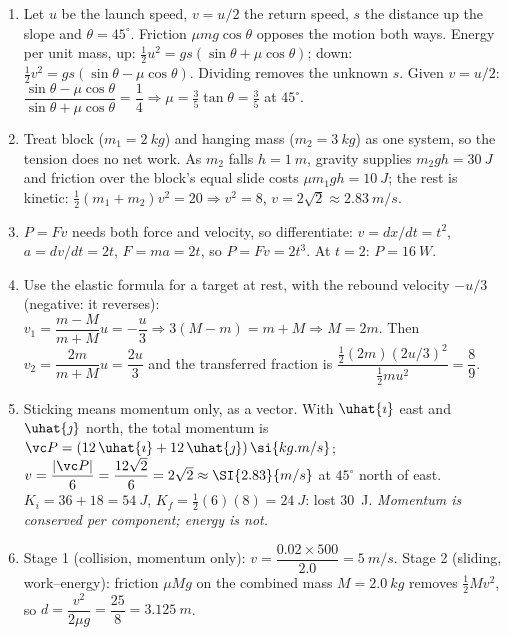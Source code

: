 \begin{enumerate}[label=\textbf{\arabic*.},itemsep=5pt]
\item Let $u$ be the launch speed, $v=u/2$ the return speed, $s$ the distance up the slope and
$\theta=45^\circ$. Friction $\mu mg\cos\theta$ opposes the motion both ways. Energy per unit mass, up:
$\tfrac12u^2=gs(\sin\theta+\mu\cos\theta)$; down: $\tfrac12v^2=gs(\sin\theta-\mu\cos\theta)$. Dividing
removes the unknown $s$.
Given $v=u/2$: $\dfrac{\sin\theta-\mu\cos\theta}{\sin\theta+\mu\cos\theta}=\dfrac14\Rightarrow
\mu=\tfrac35\tan\theta=\tfrac35$ at $45^\circ$. 

\item Treat block ($m_1=\SI{2}{kg}$) and hanging mass ($m_2=\SI{3}{kg}$) as one system, so the tension
does no net work. As $m_2$ falls $h=\SI{1}{m}$, gravity supplies $m_2gh=\SI{30}{J}$ and friction over the
block's equal slide costs $\mu m_1gh=\SI{10}{J}$; the rest is kinetic:
$\tfrac12(m_1+m_2)v^2=20\Rightarrow v^2=8$, $v=2\sqrt2\approx\SI{2.83}{m/s}$.

\item $P=Fv$ needs both force and velocity, so differentiate: $v=dx/dt=t^2$, $a=dv/dt=2t$, $F=ma=2t$,
so $P=Fv=2t^3$. At $t=2$: $P=\SI{16}{W}$. 

\item Use the elastic formula for a target at rest, with the rebound velocity $-u/3$ (negative: it
reverses): $v_1=\dfrac{m-M}{m+M}u=-\dfrac{u}{3}\Rightarrow 3(M-m)=m+M\Rightarrow M=2m$. Then
$v_2=\dfrac{2m}{m+M}u=\dfrac{2u}{3}$ and the transferred fraction is
$\dfrac{\tfrac12(2m)(2u/3)^2}{\tfrac12mu^2}=\dfrac89$. 

\item Sticking means momentum only, as a vector. With $\uhat{\imath}$ east and $\uhat{\jmath}$ north,
the total momentum is $\vc P=(12\,\uhat{\imath}+12\,\uhat{\jmath})\,\si{kg.m/s}$; $v=\dfrac{|\vc P|}{6}=
\dfrac{12\sqrt2}{6}=2\sqrt2\approx\SI{2.83}{m/s}$ at $45^\circ$ north of east.
$K_i=36+18=\SI{54}{J}$, $K_f=\tfrac12(6)(8)=\SI{24}{J}$: lost \SI{30}{J}. \emph{Momentum is conserved
per component; energy is not.} 

\item Stage 1 (collision, momentum only): $v=\dfrac{0.02\times500}{2.0}=\SI{5}{m/s}$. Stage 2 (sliding,
work--energy): friction $\mu Mg$ on the combined mass $M=\SI{2.0}{kg}$ removes $\tfrac12Mv^2$, so
$d=\dfrac{v^2}{2\mu g}=\dfrac{25}{8}=\SI{3.125}{m}$. 


\end{enumerate}
